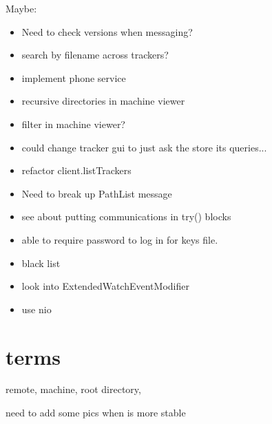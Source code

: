\documentclass{article}
\begin{document}
Maybe:
\begin{itemize}
\item Need to check versions when messaging?
\item search by filename across trackers?
\item implement phone service
\item recursive directories in machine viewer
\item filter in machine viewer?
\item could change tracker gui to just ask the store its queries...
\item refactor client.listTrackers
\item Need to break up PathList message
\item see about putting communications in try() {} blocks
\item able to require password to log in for keys file.
\item black list
\item look into ExtendedWatchEventModifier
\item use nio
\end{itemize}


\section{terms}
remote, machine, root directory, 

need to add some pics when is more stable
\end{document}
